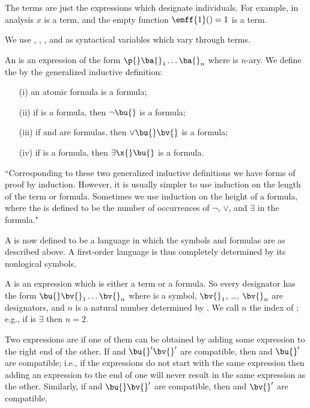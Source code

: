\begin{remark}
    The terms are just the expressions which designate individuals.
    For example, in analysis $x$ is a term, and the empty function $\emff{1}( ) = 1$ is a term.
\end{remark}
We use \ba{}, \bb{}, \bc{}, and \bd{} as syntactical variables which vary through terms.

An  is an expression of the form $\p{}\ba{}_1\dots \ba{}_n$ where \p{} is $n$-ary.
We define the  by the generalized inductive definition:
\begin{enumerate}
    \item[(i)] an atomic formula is a formula;
    \item[(ii)] if \bu{} is a formula, then $\neg \bu{}$ is a formula;
    \item[(iii)] if \bu{} and \bv{} are formulas, then $\vee \bu{}\bv{}$ is a formula;
    \item[(iv)] if \bu{} is a formula, then $\exists \x{} \bu{}$ is a formula.
\end{enumerate}

\begin{remark}
    ``Corresponding to these two generalized inductive definitions we have forms of proof by induction.
    However, it is usually simpler to use induction on the length of the term or formula.
    Sometimes we use induction on the height of a formula, where the  is defined to be the number of occurrences of $\neg$, $\vee$, and $\exists$ in the formula."
\end{remark}

A  is now defined to be a language in which the symbols and formulas are as described above.
A first-order language is thus completely determined by its nonlogical symbols.

A  is an expression which is either a term or a formula.
So every designator has the form $\bu{}\bv{}_1 \dots \bv{}_n$ where \bu{} is a symbol, $\bv{}_1$, \dots, $\bv{}_n$ are designators, and $n$ is a natural number determined by \bu{}.
We call $n$ the index of \bu{};
e.g., if \bu{} is $\exists$ then $n = 2$.

Two expressions are  if one of them can be obtained by adding some expression to the right end of the other.
If \bu{}\bv{} and $\bu{}'\bv{}'$ are compatible, then \bu{} and $\bu{}'$ are compatible;
i.e., if the expressions do not start with the same expression then adding an expression to the end of one will never result in the same expression as the other.
Similarly, if \bu{}\bv{} and $\bu{}\bv{}'$ are compatible, then \bv{} and $\bv{}'$ are compatible.


